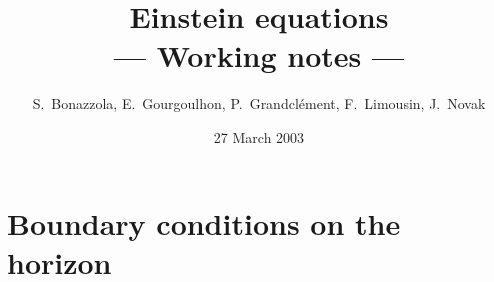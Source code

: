 \documentclass[11pt,a4paper]{report}
\begin{document}
%
%
\def \w#1{\mbox{\ssg {#1}}}
\def \wf#1{\mbox{\ssgf {#1}}}
\def \wg#1{\mbox{\boldmath ${#1}$}}
\def \wp#1{{\bf {#1}}}
%
%
\newcommand{\der}[2]{\frac{\partial #1}{\partial #2}}
\newcommand{\dder}[2]{\frac{\partial^2 #1}{\partial #2 ^2}}
%
\def\be{\begin{equation}}
\def\ee{\end{equation}}
\def\bea{\begin{eqnarray}}
\def\eea{\end{eqnarray}}
\let\gm\gamma
\def\tgm{\tilde\gamma}
\def\tna{\tilde D}
\def\taa{\tilde A}
\def\cD{{\cal D}}
\def\th{\theta}
\def\ph{\varphi}
\def\hr{{\hat r}}
\def\hth{{\hat\th}}
\def\hph{{\hat\ph}}
\def\dd{\w{d}}
\newcommand{\df}[2]{ \frac{\partial {#1}}{\partial {#2}} }
\newcommand{\dff}[2]{ \frac{\partial^2 {#1}}{\partial {#2}^2} }

\newcommand{\compar}[1]{\noindent\textsl{$\diamond$ \footnotesize #1}}

\title{\Huge \bf Einstein equations\\[5mm]
{\bf \Large --- Working notes ---}}

\author{S.~Bonazzola, E.~Gourgoulhon, P.~Grandcl\'ement, F.~Limousin, J.~Novak}

\date{27 March 2003}

\maketitle

\tableofcontents







\chapter{Boundary conditions on the horizon}




\end{document}

